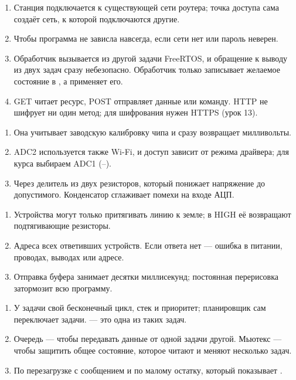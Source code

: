 \begin{enumerate}
  \item Станция подключается к существующей сети роутера; точка доступа сама создаёт сеть, к которой подключаются другие.
  \item Чтобы программа не зависла навсегда, если сети нет или пароль неверен.
  \item Обработчик вызывается из другой задачи FreeRTOS, и обращение к выводу из двух задач сразу небезопасно. Обработчик только записывает желаемое состояние в , а  применяет его.
  \item GET читает ресурс, POST отправляет данные или команду. HTTP не шифрует ни один метод; для шифрования нужен HTTPS (урок 13).
\end{enumerate}

\begin{enumerate}
  \item Она учитывает заводскую калибровку чипа и сразу возвращает милливольты.
  \item ADC2 используется также Wi-Fi, и доступ зависит от режима драйвера; для курса выбираем ADC1 (--).
  \item Через делитель из двух резисторов, который понижает напряжение до допустимого. Конденсатор сглаживает помехи на входе АЦП.
\end{enumerate}

\begin{enumerate}
  \item Устройства могут только притягивать линию к земле; в HIGH её возвращают подтягивающие резисторы.
  \item Адреса всех ответивших устройств. Если ответа нет --- ошибка в питании, проводах, выводах или адресе.
  \item Отправка буфера занимает десятки миллисекунд; постоянная перерисовка затормозит всю программу.
\end{enumerate}

\begin{enumerate}
  \item У задачи свой бесконечный цикл, стек и приоритет; планировщик сам переключает задачи.  --- это одна из таких задач.
  \item Очередь --- чтобы передавать данные от одной задачи другой. Мьютекс --- чтобы защитить общее состояние, которое читают и меняют несколько задач.
  \item По перезагрузке с сообщением  и по малому остатку, который показывает .
\end{enumerate}


